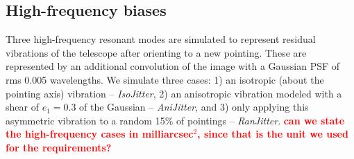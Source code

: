 \documentclass[aps,prd, amsmath,amssymb,superscriptaddress,showkeys,nofootinbib,reprint,preprintnumbers]{revtex4-1}
\newcommand{\verify}[1]{\textcolor{red}{\textbf{{#1}}}}
\begin{document}
\subsection{High-frequency biases}\label{sec:low}

Three high-frequency resonant modes are simulated to represent residual vibrations of the telescope after orienting to a new pointing. 
These are represented by an additional convolution of the image with a Gaussian PSF of rms 0.005 wavelengths. We simulate three cases: 1) an isotropic (about the pointing axis) vibration  -- \emph{IsoJitter}, 2) an anisotropic vibration modeled with a shear of $e_1=0.3$ of the Gaussian  -- \emph{AniJitter}, and 3) only applying this asymmetric vibration to a random 15\% of pointings  -- \emph{RanJitter}. \verify{can we state the high-frequency cases in milliarcsec$^2$, since that is the unit we used for the requirements?}
\end{document}
